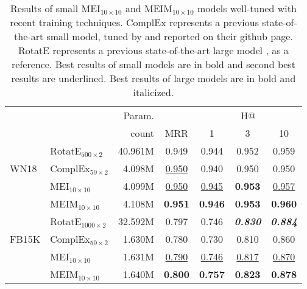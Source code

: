 \documentclass{ecai}
\theoremstyle{plain}  \newtheorem{thm}{Theorem}  \newtheorem{lem}[thm]{Lemma}  \newtheorem{prop}[thm]{Proposition}
\theoremstyle{remark}  \newtheorem*{rem}{Remark}
\begin{document}
\begin{table}\begin{center}
		\caption{Results of small MEI$ _{10 \times 10} $ \cite{tran_multipartitionembeddinginteraction_2020} and MEIM$ _{10 \times 10} $ \cite{tran_meimmultipartitionembedding_2022} models well-tuned with recent training techniques. ComplEx represents a previous state-of-the-art small model, tuned by \cite{lacroix_canonicaltensordecomposition_2018} and reported on their github page. RotatE represents a previous state-of-the-art large model \cite{sun_rotateknowledgegraph_2019}, as a reference. Best results of small models are in bold and second best results are underlined. Best results of large models are in bold and italicized.}
		\label{tab:result_tuned_small}
		
		\begin{adjustbox}{max width=\columnwidth}
			\begin{tabular}{@{\extracolsep{-3.5pt}}llrcccc}
				\toprule
				& & Param. & & \multicolumn{3}{c}{H@} \\
				& & count & MRR & 1 & 3 & 10 \\
\midrule
				
				& RotatE$ _{500 \times 2} $ & 40.961M & 0.949 & 0.944 & 0.952 & 0.959 \\ \cmidrule{3-7}
				\multirow{1}{*}{WN18} & ComplEx$ _{50 \times 2} $ & 4.098M & \underline{0.950} & 0.940 & 0.950 & 0.950 \\
				
				& MEI$ _{10 \times 10} $ & 4.099M & \underline{0.950} & \underline{0.945} & \textbf{0.953} & \underline{0.957} \\ & MEIM$ _{10 \times 10} $ & 4.108M & \textbf{0.951} & \textbf{0.946} & \textbf{0.953} & \textbf{0.960} \\ \midrule
				\midrule
				
				& RotatE$ _{1000 \times 2} $ & 32.592M & 0.797 & 0.746 & \textit{\textbf{0.830}} & \textit{\textbf{0.884}} \\ \cmidrule{3-7}
				\multirow{1}{*}{FB15K} & ComplEx$ _{50 \times 2} $ & 1.630M & 0.780 & 0.730 & 0.810 & 0.860 \\
				
				& MEI$ _{10 \times 10} $ & 1.631M & \underline{0.790} & \underline{0.746} & \underline{0.817} & \underline{0.870} \\ & MEIM$ _{10 \times 10} $ & 1.640M & \textbf{0.800} & \textbf{0.757} & \textbf{0.823} & \textbf{0.878} \\ \midrule
				\midrule
				

\end{tabular}
\end{adjustbox}
\end{center}
\end{table}
\end{document}
